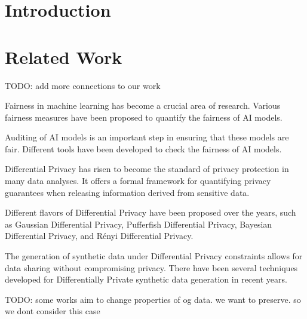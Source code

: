 \documentclass[manuscript,screen,review,anonymous]{acmart}
\begin{document}
\section{Introduction}

\section{Related Work}

TODO: add more connections to our work

Fairness in machine learning has become a crucial area of research\cite{barocas2023fairness}. Various fairness measures have been proposed to quantify\cite{yeh2024analyzing} the fairness of AI models\cite{pessach2022review,corbett2017algorithmic,vzliobaite2017measuring,hardt2016equality,corbett2017algorithmic,berk2021fairness,chouldechova2017fair,kleinberg2016inherent}.

Auditing of AI models is an important step in ensuring that these models are fair\cite{ferrara2023fairness}. Different tools have been developed to check the fairness of AI models\cite{yuan2024ensuring,saleiro2018aequitas,bellamy2019ai,bird2020fairlearn}.


Differential Privacy has risen to become the standard of privacy protection in many data analyses\cite{jiang2021applications}. It offers a formal framework for quantifying privacy guarantees when releasing information derived from sensitive data\cite{dwork2006calibrating,dwork2014algorithmic}.

Different flavors of Differential Privacy have been proposed over the years\cite{desfontaines2019sok}, such as Gaussian Differential Privacy\cite{dong2022gaussian}, Pufferfish Differential Privacy\cite{kifer2012rigorous}, Bayesian Differential Privacy\cite{triastcyn2020bayesian}, and R\'enyi Differential Privacy\cite{mironov2017renyi}.


The generation of synthetic data\cite{raghunathan2021synthetic,lu2023machine} under Differential Privacy constraints allows for data sharing without compromising privacy\cite{tao2021benchmarking}. There have been several techniques developed for Differentially Private synthetic data generation\cite{rosenblatt2020differentially,fan2020relational,bowen2019comparative,bowen2020comparative,arnold2020really,xu2019modeling} in recent years.

TODO: some works aim to change properties of og data. we want to preserve. so we dont consider this case
\end{document}
